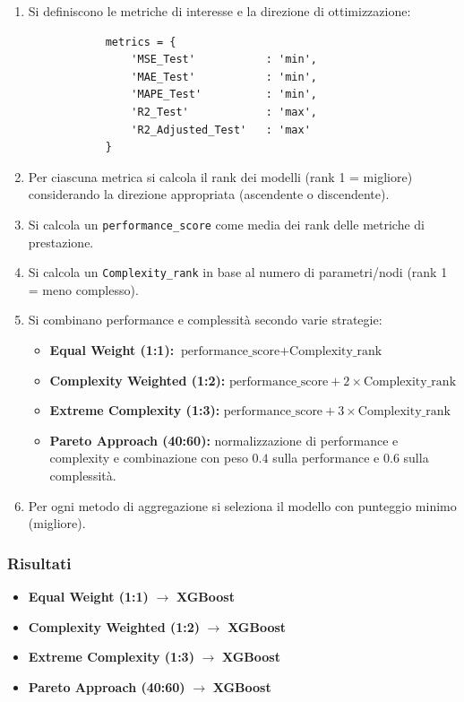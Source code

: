 \documentclass[a4paper,12pt]{report}
\begin{document}
	\begin{enumerate}
		\item Si definiscono le metriche di interesse e la direzione di ottimizzazione:
		\begin{verbatim}
			metrics = {
				'MSE_Test'           : 'min',
				'MAE_Test'           : 'min',
				'MAPE_Test'          : 'min',
				'R2_Test'            : 'max',
				'R2_Adjusted_Test'   : 'max'
			}
		\end{verbatim}
		\item Per ciascuna metrica si calcola il rank dei modelli (rank 1 = migliore) considerando la direzione appropriata (ascendente o discendente).
		\item Si calcola un \texttt{performance\_score} come media dei rank delle metriche di prestazione.
		\item Si calcola un \texttt{Complexity\_rank} in base al numero di parametri/nodi (rank 1 = meno complesso).
		\item Si combinano performance e complessità secondo varie strategie:
		\begin{itemize}
			\item \textbf{Equal Weight (1:1):} \(\text{performance\_score} + \text{Complexity\_rank}\)
			\item \textbf{Complexity Weighted (1:2):} \(\text{performance\_score} + 2 \times \text{Complexity\_rank}\)
			\item \textbf{Extreme Complexity (1:3):} \(\text{performance\_score} + 3 \times \text{Complexity\_rank}\)
			\item \textbf{Pareto Approach (40:60):} normalizzazione di performance e complexity e combinazione con peso \(0.4\) sulla performance e \(0.6\) sulla complessità.
		\end{itemize}
		\item Per ogni metodo di aggregazione si seleziona il modello con punteggio minimo (migliore).
	\end{enumerate}
	
	\subsubsection{Risultati}
	\begin{itemize}
		\item \textbf{Equal Weight (1:1)} \(\rightarrow\) \textbf{XGBoost}
		\item \textbf{Complexity Weighted (1:2)} \(\rightarrow\) \textbf{XGBoost}
		\item \textbf{Extreme Complexity (1:3)} \(\rightarrow\) \textbf{XGBoost}
		\item \textbf{Pareto Approach (40:60)} \(\rightarrow\) \textbf{XGBoost}
	\end{itemize}
	
\end{document}
